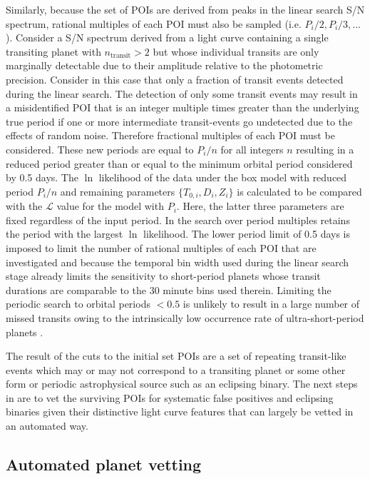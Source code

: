 Similarly, because the set of POIs are derived from peaks in the linear search S/N spectrum, 
rational multiples of each POI must also be sampled (i.e. $P_i/2,P_i/3,\dots$).
Consider a S/N spectrum derived from a light curve containing a single transiting planet with
$n_{\text{transit}}>2$ but whose individual transits are only marginally detectable  due to their
amplitude relative to the photometric precision. Consider in this case that only a fraction of
transit events detected during the linear search.
The detection of only some transit events may result in a misidentified
POI that is an integer multiple times greater than the underlying true period if one or more
intermediate transit-events go undetected due to the effects of random noise.
Therefore fractional multiples of each POI must be considered. These new periods are equal to
$P_i/n$ for all integers $n$ resulting in a reduced period greater than or equal to the minimum
orbital period considered by \pipeline{:} 0.5 days. The $\ln$ likelihood of the data under
the box model with reduced period $P_i/n$ and remaining parameters $\{T_{0,i},D_i,Z_i\}$ is calculated
to be compared with the $\mathcal{L}$ value for the model with $P_i$. Here, the latter three parameters
are fixed regardless of the input period. In the search over period
multiples retains the period with the largest $\ln$ likelihood.
The lower period limit of 0.5 days is imposed to limit the number of rational multiples of each POI that
are investigated and because the temporal bin width used during the linear search stage already limits
the sensitivity to short-period planets whose transit durations are comparable to the 30 minute bins used
therein. Limiting the periodic search to orbital periods $< 0.5$ is
unlikely to result in a large number of missed transits owing to the intrinsically low occurrence rate of
ultra-short-period planets \citep[$\lesssim 1$\%;][]{sanchisojeda14,adams16}.

The result of the cuts to the initial set POIs are a set of repeating transit-like events which may or
may not correspond to a transiting planet or some other form or periodic astrophysical source
such as an eclipsing binary. The next steps in \pipeline{} are to vet the surviving POIs for systematic
false positives and eclipsing binaries given their distinctive light curve features that can largely
be vetted in an automated way.


\subsection{Automated planet vetting} \label{sect:vetting}
